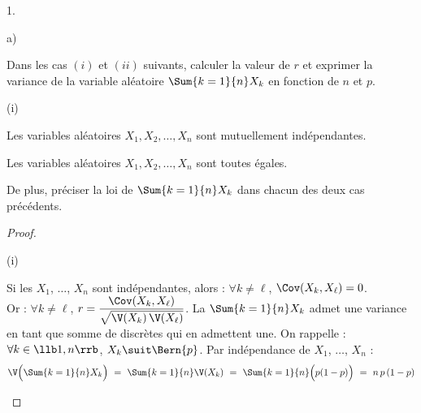 \documentclass[11pt]{article}%
\begin{document}
\begin{noliste}{1.}
  \setlength{\itemsep}{4mm}
  \item
  \begin{noliste}{a)}
    \setlength{\itemsep}{2mm}
    \item Dans les cas $(i)$ et $(ii)$ suivants, calculer la valeur 
    de $r$ et exprimer la variance de la variable aléatoire $ 
    \Sum{k=1}{n} X_k$ en fonction de $n$ et $p$.
    \begin{nonoliste}{(i)}
      \item Les variables aléatoires $X_1, X_2, \ldots, X_n$ sont 
      mutuellement indépendantes.
      
      \item Les variables aléatoires $X_1, X_2, \ldots, X_n$ sont 
      toutes égales.
    \end{nonoliste}
    
    De plus, préciser la loi de $\Sum{k=1}{n} X_k$ dans chacun 
    des deux cas précédents.
    
    \begin{proof}~
      \begin{nonoliste}{(i)}
      \item Si les \var $X_1$, $\ldots$, $X_n$ sont indépendantes,
        alors : $\forall k \neq \ell$, $\Cov(X_k,X_\ell)=0$.\\[.1cm]
        Or : $\forall k \neq \ell$, $r = \dfrac{\Cov(X_k,X_\ell)}{
          \sqrt{\V(X_k) \, \V(X_\ell)}}$.%
        La \var $\Sum{k=1}{n} X_k$ admet une variance en tant que
        somme de \var discrètes qui en admettent une. On rappelle :
        $\forall k \in \llb 1,n \rrb$, $X_k \suit \Bern{p}$. Par
        indépendance de $X_1$, $\ldots$, $X_n$ :
        \[
          \V\Big( \Sum{k=1}{n} X_k\Big) \ = \ \Sum{k=1}{n} \V(X_k)
          \ = \ \Sum{k=1}{n} \Big(p (1-p)\Big) \ = \ n \, p \, (1-p)
        \]
        

\end{nonoliste}
\end{proof}
\end{noliste}
\end{noliste}
\end{document}
